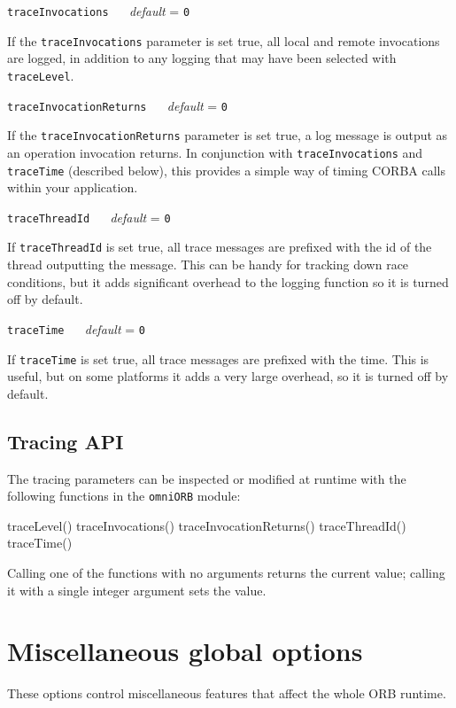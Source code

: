 \documentclass[draft,11pt,twoside,a4paper]{book}
\makeatletter
\newcommand{\code}[1]{\texttt{#1}}
\newcommand{\confopt}[2]
  {\vspace{\baselineskip}\par\noindent\code{#1} ~~ \textit{default} =
   \code{#2}\\[-1ex]\@afterheading}
\makeatother
\begin{document}
\confopt{traceInvocations}{0}

If the \code{traceInvocations} parameter is set true, all local and
remote invocations are logged, in addition to any logging that may
have been selected with \code{traceLevel}.


\confopt{traceInvocationReturns}{0}

If the \code{traceInvocationReturns} parameter is set true, a log
message is output as an operation invocation returns. In conjunction
with \code{traceInvocations} and \code{traceTime} (described below),
this provides a simple way of timing CORBA calls within your
application.


\confopt{traceThreadId}{0}

If \code{traceThreadId} is set true, all trace messages are prefixed
with the id of the thread outputting the message. This can be handy
for tracking down race conditions, but it adds significant overhead to
the logging function so it is turned off by default.


\confopt{traceTime}{0}

If \code{traceTime} is set true, all trace messages are prefixed with
the time. This is useful, but on some platforms it adds a very large
overhead, so it is turned off by default.



\subsection{Tracing API}

The tracing parameters can be inspected or modified at runtime with
the following functions in the \code{omniORB} module:

\begin{pylisting}
  traceLevel()
  traceInvocations()
  traceInvocationReturns()
  traceThreadId()
  traceTime()
\end{pylisting}

\noindent
Calling one of the functions with no arguments returns the current
value; calling it with a single integer argument sets the value.



\section{Miscellaneous global options}

These options control miscellaneous features that affect the whole ORB
runtime.
\end{document}
